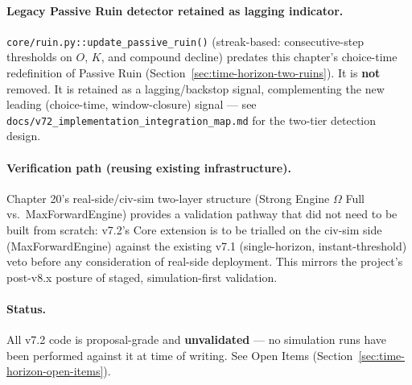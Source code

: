 \paragraph{Legacy Passive Ruin detector retained as lagging indicator.}
\texttt{core/ruin.py::update\_passive\_ruin()} (streak-based:
consecutive-step thresholds on $O$, $K$, and compound decline)
predates this chapter's choice-time redefinition of Passive Ruin
(Section~\ref{sec:time-horizon-two-ruins}). It is \textbf{not}
removed. It is retained as a lagging/backstop signal, complementing
the new leading (choice-time, window-closure) signal — see
\texttt{docs/v72\_implementation\_integration\_map.md} for the
two-tier detection design.

\paragraph{Verification path (reusing existing infrastructure).}
Chapter 20's real-side/civ-sim two-layer structure (Strong Engine
$\Omega$ Full vs.\ MaxForwardEngine) provides a validation pathway
that did not need to be built from scratch: v7.2's Core extension is
to be trialled on the civ-sim side (MaxForwardEngine) against the
existing v7.1 (single-horizon, instant-threshold) veto before any
consideration of real-side deployment. This mirrors the project's
post-v8.x posture of staged, simulation-first validation.

\paragraph{Status.} All v7.2 code is proposal-grade and
\textbf{unvalidated} — no simulation runs have been performed against
it at time of writing. See Open Items
(Section~\ref{sec:time-horizon-open-items}).
